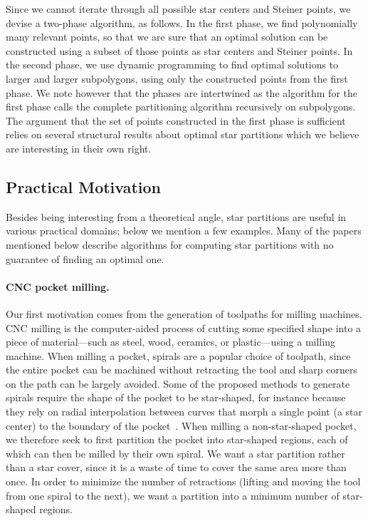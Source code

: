 \documentclass[10pt,a4paper]{article}
\begin{document}
Since we cannot iterate through all possible star centers and Steiner points, we devise a two-phase algorithm, as follows.
In the first phase, we find polynomially many relevant points, so that we are sure that an optimal solution can be constructed using a subset of those points as star centers and Steiner points.
In the second phase, we use dynamic programming to find optimal solutions to larger and larger subpolygons, using only the constructed points from the first phase.
We note however that the phases are intertwined as the algorithm for the first phase calls the complete partitioning algorithm recursively on subpolygons.
The argument that the set of points constructed in the first phase is sufficient relies on several structural results about optimal star partitions which we believe are interesting in their own right.

\subsection{Practical Motivation}\label{sec:practical}

Besides being interesting from a theoretical angle, star partitions are useful in various practical domains; below we mention a few examples.
Many of the papers mentioned below describe algorithms for computing star partitions with no guarantee of finding an optimal one.

\paragraph{CNC pocket milling.}
Our first motivation comes from the generation of toolpaths for milling machines.
CNC milling is the computer-aided process of cutting some specified shape into a piece of material---such as steel, wood, ceramics, or plastic---using a milling machine.
When milling a pocket, spirals are a popular choice of toolpath, since the entire pocket can be machined without retracting the tool and sharp corners on the path can be largely avoided.
Some of the proposed methods to generate spirals require the shape of the pocket to be star-shaped, for instance because they rely on radial interpolation between curves that morph a single point (a star center) to the boundary of the pocket~\cite{bieterman2003curvilinear,patel2019effect,banerjee2012process}.
When milling a non-star-shaped pocket, we therefore seek to first partition the pocket into star-shaped regions, each of which can then be milled by their own spiral.
We want a star partition rather than a star cover, since it is a waste of time to cover the same area more than once.
In order to minimize the number of retractions (lifting and moving the tool from one spiral to the next), we want a partition into a minimum number of star-shaped regions.
\end{document}
